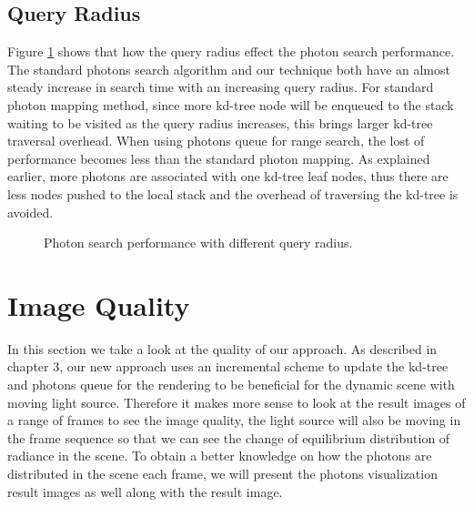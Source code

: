 \subsection{Query Radius}

Figure \ref{fig:photon_search_2} shows that how the query radius effect the photon search performance. The standard photons search algorithm and our technique both have an almost steady increase in search time with an increasing query radius. For standard photon mapping method, since more kd-tree node will be enqueued to the stack waiting to be visited as the query radius increases, this brings larger kd-tree traversal overhead. When using photons queue for range search, the lost of performance becomes less than the standard photon mapping. As explained earlier, more photons are associated with one kd-tree leaf nodes, thus there are less nodes pushed to the local stack and the overhead of traversing the kd-tree is avoided.

\begin{figure}[ftp]
    \centering
    \renewcommand{\thefigure}{\thechapter.\arabic{figure}}
    \caption[Photon search performance with different query radius]{Photon search performance with different query radius. }
    \label{fig:photon_search_2}
\end{figure}

\section{Image Quality}

In this section we take a look at the quality of our approach. As described in chapter 3, our new approach uses an incremental scheme to update the kd-tree and photons queue for the rendering to be beneficial for the dynamic scene with moving light source. Therefore it makes more sense to look at the result images of a range of frames to see the image quality, the light source will also be moving in the frame sequence so that we can see the change of equilibrium distribution of radiance in the scene. To obtain a better knowledge on how the photons are distributed in the scene each frame, we will present the photons visualization result images as well along with the result image.

